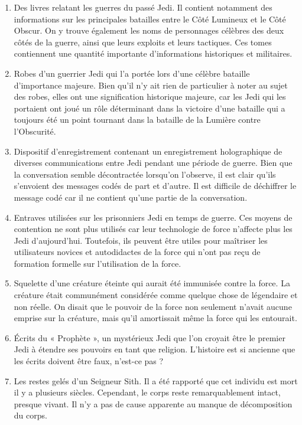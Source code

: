 \documentclass{article}
\begin{document}
\begin{enumerate}
	\item Des livres relatant les guerres du passé Jedi. Il contient notamment des informations sur les principales batailles entre le Côté Lumineux et le Côté Obscur. On y trouve également les noms de personnages célèbres des deux côtés de la guerre, ainsi que leurs exploits et leurs tactiques. Ces tomes contiennent une quantité importante d'informations historiques et militaires.
	\item Robes d'un guerrier Jedi qui l'a portée lors d'une célèbre bataille d'importance majeure. Bien qu'il n'y ait rien de particulier à noter au sujet des robes, elles ont une signification historique majeure, car les Jedi qui les portaient ont joué un rôle déterminant dans la victoire d'une bataille qui a toujours été un point tournant dans la bataille de la Lumière contre l’Obscurité.
	\item Dispositif d'enregistrement contenant un enregistrement holographique de diverses communications entre Jedi pendant une période de guerre. Bien que la conversation semble décontractée lorsqu'on l'observe, il est clair qu'ils s'envoient des messages codés de part et d'autre. Il est difficile de déchiffrer le message codé car il ne contient qu'une partie de la conversation.
	\item Entraves utilisées sur les prisonniers Jedi en temps de guerre. Ces moyens de contention ne sont plus utilisés car leur technologie de force n'affecte plus les Jedi d'aujourd'hui. Toutefois, ils peuvent être utiles pour maîtriser les utilisateurs novices et autodidactes de la force qui n'ont pas reçu de formation formelle sur l'utilisation de la force.
	\item Squelette d'une créature éteinte qui aurait été immunisée contre la force. La créature était communément considérée comme quelque chose de légendaire et non réelle. On disait que le pouvoir de la force non seulement n'avait aucune emprise sur la créature, mais qu'il amortissait même la force qui les entourait.
	\item Écrits du « Prophète », un mystérieux Jedi que l'on croyait être le premier Jedi à étendre ses pouvoirs en tant que religion. L'histoire est si ancienne que les écrits doivent être faux, n'est-ce pas ?
	\item Les restes gelés d'un Seigneur Sith. Il a été rapporté que cet individu est mort il y a plusieurs siècles. Cependant, le corps reste remarquablement intact, presque vivant. Il n'y a pas de cause apparente au manque de décomposition du corps.
\end{enumerate}
\end{document}

